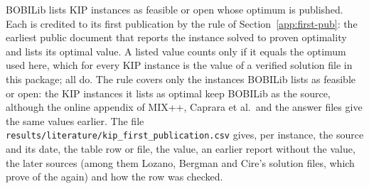 BOBILib lists \NumLitKip{} KIP instances as feasible or open whose optimum is
published. Each is credited to its first publication by the rule of
Section~\ref{app:first-pub}: the earliest public document that reports the
instance solved to proven optimality and lists its optimal value. A listed
value counts only if it equals the optimum used here, which for every KIP
instance is the value of a verified solution file in this package; all
\NumLitKip{} do. The rule covers only the instances BOBILib lists as feasible or
open: the \NumBobiOptKip{} KIP instances it lists as optimal keep BOBILib as the
source, although the online appendix of MIX++,\cite{fischetti2016appendix}
Caprara et al.\ and the answer files give the same values earlier. The file \texttt{results/literature/kip\_first\_publication.csv}
gives, per instance, the source and its date, the table row or file, the
value, an earlier report without the value, the later sources (among them
Lozano, Bergman and Cire's solution files,\cite{lozano_dbo_repo} which prove
\NumLitKipLaterLozano{} of the \NumLitKip{} again) and how the row was checked.
